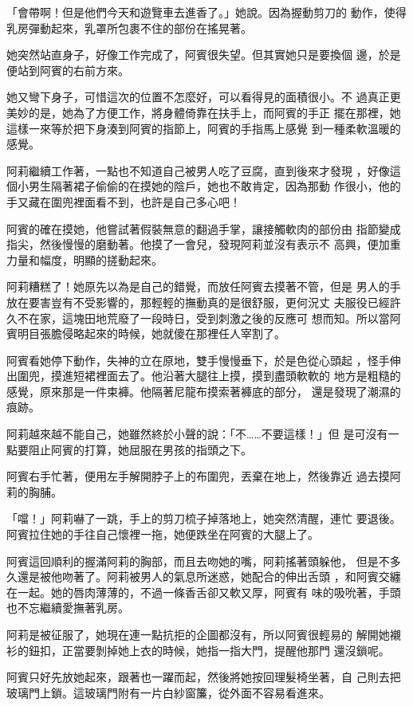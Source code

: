 「會帶啊！但是他們今天和遊覽車去進香了。」她說。因為握動剪刀的
動作，使得乳房彈動起來，乳罩所包裹不住的部份在搖晃著。

她突然站直身子，好像工作完成了，阿賓很失望。但其實她只是要換個
邊，於是便站到阿賓的右前方來。

她又彎下身子，可惜這次的位置不怎麼好，可以看得見的面積很小。不
過真正更美妙的是，她為了方便工作，將身體倚靠在扶手上，而阿賓的手正
擺在那裡，她這樣一來等於把下身湊到阿賓的指節上，阿賓的手指馬上感覺
到一種柔軟溫暖的感覺。

阿莉繼續工作著，一點也不知道自己被男人吃了豆腐，直到後來才發現
，好像這個小男生隔著裙子偷偷的在摸她的陰戶，她也不敢肯定，因為那動
作很小，他的手又藏在圍兜裡面看不到，也許是自己多心吧！

阿賓的確在摸她，他嘗試著假裝無意的翻過手掌，讓接觸軟肉的部份由
指節變成指尖，然後慢慢的磨動著。他摸了一會兒，發現阿莉並沒有表示不
高興，便加重力量和幅度，明顯的搓動起來。

阿莉糟糕了！她原先以為是自己的錯覺，而放任阿賓去摸著不管，但是
男人的手放在要害豈有不受影響的，那輕輕的撫動真的是很舒服，更何況丈
夫服役已經許久不在家，這塊田地荒廢了一段時日，受到刺激之後的反應可
想而知。所以當阿賓明目張膽侵略起來的時候，她就傻在那裡任人宰割了。

阿賓看她停下動作，失神的立在原地，雙手慢慢垂下，於是色從心頭起
，怪手伸出圍兜，摸進短裙裡面去了。他沿著大腿往上摸，摸到盡頭軟軟的
地方是粗糙的感覺，原來那是一件束褲。他隔著尼龍布摸索著褲底的部分，
還是發現了潮濕的痕跡。

阿莉越來越不能自己，她雖然終於小聲的說：「不……不要這樣！」但
是可沒有一點要阻止阿賓的打算，她屈服在男孩的指頭之下。

阿賓右手忙著，便用左手解開脖子上的布圍兜，丟棄在地上，然後靠近
過去摸阿莉的胸脯。

「噹！」阿莉嚇了一跳，手上的剪刀梳子掉落地上，她突然清醒，連忙
要退後。阿賓拉住她的手往自己懷裡一拖，她便跌坐在阿賓的大腿上了。

阿賓這回順利的握滿阿莉的胸部，而且去吻她的嘴，阿莉搖著頭躲他，
但是不多久還是被他吻著了。阿莉被男人的氣息所迷惑，她配合的伸出舌頭
，和阿賓交纏在一起。她的唇肉薄薄的，不過一條香舌卻又軟又厚，阿賓有
味的吸吮著，手頭也不忘繼續愛撫著乳房。

阿莉是被征服了，她現在連一點抗拒的企圖都沒有，所以阿賓很輕易的
解開她襯衫的鈕扣，正當要剝掉她上衣的時候，她指一指大門，提醒他那門
還沒鎖呢。

阿賓只好先放她起來，跟著也一躍而起，然後將她按回理髮椅坐著，自
己則去把玻璃門上鎖。這玻璃門附有一片白紗窗簾，從外面不容易看進來。

